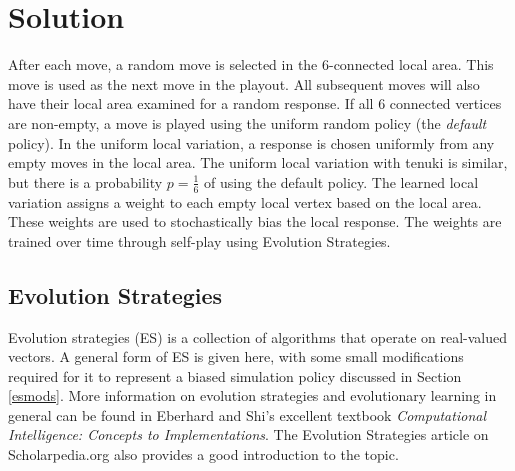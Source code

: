 \documentclass[10pt,a4paper]{report}
\begin{document}
\section{Solution}\label{solution}
After each move, a random move is selected in the 6-connected local area. This move is used as the next move in the playout. All subsequent moves will also have their local area examined for a random response. If all 6 connected vertices are non-empty, a move is played using the uniform random policy (the \emph{default} policy). In the uniform local variation, a response is chosen uniformly from any empty moves in the local area. The uniform local variation with tenuki is similar, but there is a probability $p=\frac{1}{6}$ of using the default policy. The learned local variation assigns a weight to each empty local vertex based on the local area. These weights are used to stochastically bias the local response. The weights are trained over time through self-play using Evolution Strategies.

\subsection{Evolution Strategies}
Evolution strategies (ES) is a collection of algorithms that operate on real-valued vectors. A general form of ES is given here, with some small modifications required for it to represent a biased simulation policy discussed in Section \ref{esmods}. More information on evolution strategies and evolutionary learning in general can be found in Eberhard and Shi's excellent textbook \emph{Computational Intelligence: Concepts to Implementations}\cite{eberhart2007computational}. The Evolution Strategies article on Scholarpedia.org also provides a good introduction to the topic\cite{Beyer:2007}.
\end{document}
